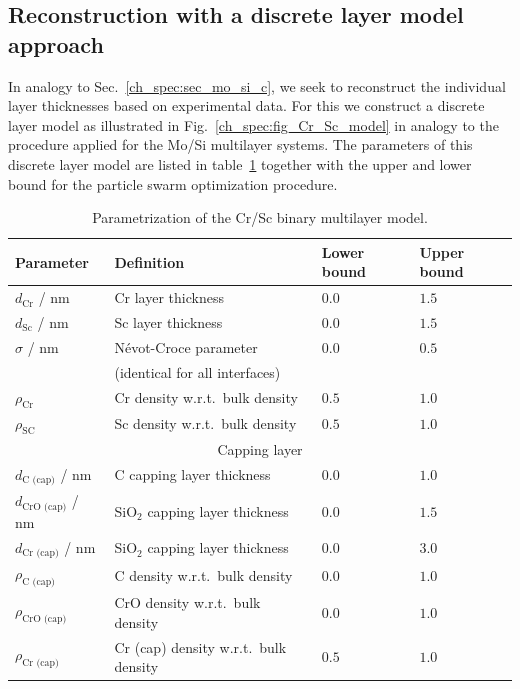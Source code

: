 \subsection{Reconstruction with a discrete layer model approach}
In analogy to Sec.~\ref{ch_spec:sec_mo_si_c}, we seek to reconstruct the individual layer thicknesses based on experimental data. For this we construct a discrete layer model as illustrated in Fig.~\ref{ch_spec:fig_Cr_Sc_model} in analogy to the procedure applied for the Mo/Si multilayer systems. The parameters of this discrete layer model are listed in table~\ref{ch_spec:tbl_cr_sc_binary_parameters} together with the upper and lower bound for the particle swarm optimization procedure.
\begin{table}[htbp]
\centering
\caption{Parametrization of the Cr/Sc binary multilayer model.}
\label{ch_spec:tbl_cr_sc_binary_parameters}
\begin{tabular}{@{}llll@{}}
\toprule
Parameter & Definition & Lower bound & Upper bound\\ \midrule
$d_\text{Cr}$ / nm & Cr layer thickness & $0.0$& $1.5$\\ 
$d_\text{Sc}$ / nm & Sc layer thickness& $0.0$& $1.5$\\ 
$\sigma$ / nm & N\'{e}vot-Croce parameter& $0.0$& $0.5$\\ 
&(identical for all interfaces)&&\\
$\rho_\text{Cr}$ &Cr density w.r.t.~bulk density & $0.5$& $1.0$\\ 
$\rho_\text{SC}$ &Sc density w.r.t.~bulk density& $0.5$& $1.0$\\ 
\midrule
\multicolumn{4}{c}{Capping layer}\\
\midrule
$d_\text{C (cap)}$ / nm & C capping layer thickness & $0.0$&$1.0$ \\ 
$d_\text{CrO (cap)}$ / nm & SiO$_2$ capping layer thickness & $0.0$&$1.5$ \\ 
$d_\text{Cr (cap)}$ / nm & SiO$_2$ capping layer thickness & $0.0$&$3.0$ \\ 
$\rho_\text{C (cap)}$ &C density w.r.t.~bulk density& $0.0$& $1.0$\\ 
$\rho_\text{CrO (cap)}$& CrO density w.r.t.~bulk density& $0.0$& $1.0$\\
$\rho_\text{Cr (cap)}$& Cr (cap) density w.r.t.~bulk density & $0.5$& $1.0$  \\
 \bottomrule
\end{tabular}
\end{table}

